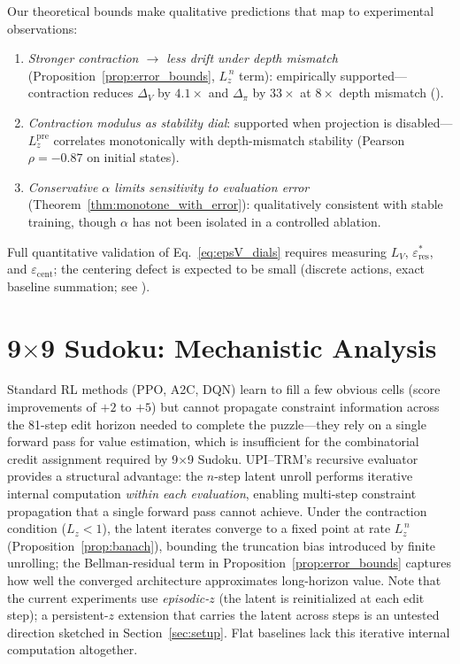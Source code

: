 \documentclass{article}
\theoremstyle{plain}
\theoremstyle{definition}
\theoremstyle{remark}
\begin{document}
Our theoretical bounds make qualitative predictions that map to experimental observations:
\begin{enumerate}[nosep,leftmargin=*]
\item \emph{Stronger contraction $\to$ less drift under depth mismatch} (Proposition~\ref{prop:error_bounds}, $L_z^{\,n}$ term): empirically supported---contraction reduces $\Delta_V$ by $4.1\times$ and $\Delta_\pi$ by $33\times$ at $8\times$ depth mismatch ().
\item \emph{Contraction modulus as stability dial}: supported when projection is disabled---$L_z^{\mathrm{pre}}$ correlates monotonically with depth-mismatch stability (Pearson $\rho = -0.87$ on initial states).
\item \emph{Conservative $\alpha$ limits sensitivity to evaluation error} (Theorem~\ref{thm:monotone_with_error}): qualitatively consistent with stable training, though $\alpha$ has not been isolated in a controlled ablation.
\end{enumerate}
Full quantitative validation of Eq.~\eqref{eq:epsV_dials} requires measuring $L_V$, $\varepsilon_{\mathrm{res}}^*$, and $\varepsilon_{\mathrm{cent}}$; the centering defect is expected to be small (discrete actions, exact baseline summation; see ).

\section{9$\times$9 Sudoku: Mechanistic Analysis}
\label{app:9x9_analysis}

Standard RL methods (PPO, A2C, DQN) learn to fill a few obvious cells (score improvements of $+2$ to $+5$) but cannot propagate constraint information across the 81-step edit horizon needed to complete the puzzle---they rely on a single forward pass for value estimation, which is insufficient for the combinatorial credit assignment required by 9$\times$9 Sudoku.
UPI--TRM's recursive evaluator provides a structural advantage: the $n$-step latent unroll performs iterative internal computation \emph{within each evaluation}, enabling multi-step constraint propagation that a single forward pass cannot achieve.
Under the contraction condition ($L_z < 1$), the latent iterates converge to a fixed point at rate $L_z^{\,n}$ (Proposition~\ref{prop:banach}), bounding the truncation bias introduced by finite unrolling; the Bellman-residual term in Proposition~\ref{prop:error_bounds} captures how well the converged architecture approximates long-horizon value.
Note that the current experiments use \emph{episodic-$z$} (the latent is reinitialized at each edit step); a persistent-$z$ extension that carries the latent across steps is an untested direction sketched in Section~\ref{sec:setup}.
Flat baselines lack this iterative internal computation altogether.
\end{document}
